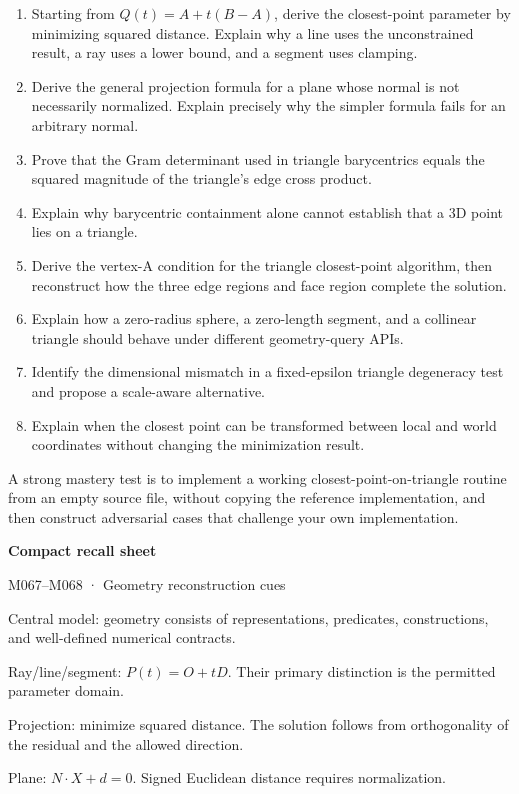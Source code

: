 \begin{enumerate}
\def\labelenumi{\arabic{enumi}.}
\tightlist
\item
  Starting from \(Q(t)=A+t(B-A)\), derive the closest-point parameter by minimizing squared distance. Explain why a line uses the unconstrained result, a ray uses a lower bound, and a segment uses clamping.
\item
  Derive the general projection formula for a plane whose normal is not necessarily normalized. Explain precisely why the simpler formula fails for an arbitrary normal.
\item
  Prove that the Gram determinant used in triangle barycentrics equals the squared magnitude of the triangle's edge cross product.
\item
  Explain why barycentric containment alone cannot establish that a 3D point lies on a triangle.
\item
  Derive the vertex-A condition for the triangle closest-point algorithm, then reconstruct how the three edge regions and face region complete the solution.
\item
  Explain how a zero-radius sphere, a zero-length segment, and a collinear triangle should behave under different geometry-query APIs.
\item
  Identify the dimensional mismatch in a fixed-epsilon triangle degeneracy test and propose a scale-aware alternative.
\item
  Explain when the closest point can be transformed between local and world coordinates without changing the minimization result.
\end{enumerate}

A strong mastery test is to implement a working closest-point-on-triangle routine from an empty source file, without copying the reference implementation, and then construct adversarial cases that challenge your own implementation.

\textbf{Compact recall sheet}

M067--M068 · Geometry reconstruction cues

Central model: geometry consists of representations, predicates, constructions, and well-defined numerical contracts.

Ray/line/segment: \(P(t)=O+tD\). Their primary distinction is the permitted parameter domain.

Projection: minimize squared distance. The solution follows from orthogonality of the residual and the allowed direction.

Plane: \(N\cdot X+d=0\). Signed Euclidean distance requires normalization.

